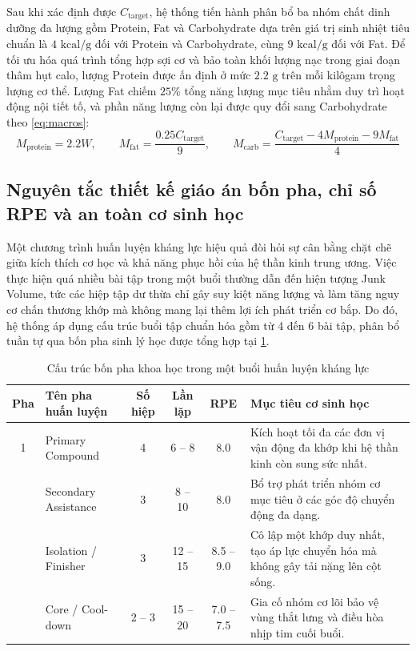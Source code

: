 Sau khi xác định được $C_{\text{target}}$, hệ thống tiến hành phân bổ ba nhóm chất dinh dưỡng đa lượng gồm Protein, Fat và Carbohydrate dựa trên giá trị sinh nhiệt tiêu chuẩn là $4\text{ kcal/g}$ đối với Protein và Carbohydrate, cùng $9\text{ kcal/g}$ đối với Fat. Để tối ưu hóa quá trình tổng hợp sợi cơ và bảo toàn khối lượng nạc trong giai đoạn thâm hụt calo, lượng Protein được ấn định ở mức $2.2\text{ g}$ trên mỗi kilôgam trọng lượng cơ thể. Lượng Fat chiếm $25\%$ tổng năng lượng mục tiêu nhằm duy trì hoạt động nội tiết tố, và phần năng lượng còn lại được quy đổi sang Carbohydrate theo \cref{eq:macros}:
\begin{equation}
    M_{\text{protein}} = 2.2W, \qquad M_{\text{fat}} = \frac{0.25 C_{\text{target}}}{9}, \qquad M_{\text{carb}} = \frac{C_{\text{target}} - 4M_{\text{protein}} - 9M_{\text{fat}}}{4}
    \label{eq:macros}
\end{equation}

\subsection{Nguyên tắc thiết kế giáo án bốn pha, chỉ số RPE và an toàn cơ sinh học}
\label{subsec:nguyen_tac_tap}

Một chương trình huấn luyện kháng lực hiệu quả đòi hỏi sự cân bằng chặt chẽ giữa kích thích cơ học và khả năng phục hồi của hệ thần kinh trung ương. Việc thực hiện quá nhiều bài tập trong một buổi thường dẫn đến hiện tượng Junk Volume, tức các hiệp tập dư thừa chỉ gây suy kiệt năng lượng và làm tăng nguy cơ chấn thương khớp mà không mang lại thêm lợi ích phát triển cơ bắp. Do đó, hệ thống áp dụng cấu trúc buổi tập chuẩn hóa gồm từ 4 đến 6 bài tập, phân bổ tuần tự qua bốn pha sinh lý học được tổng hợp tại \cref{tab:four_phases}.

\begin{table}[htbp]
\centering
\small
\caption{Cấu trúc bốn pha khoa học trong một buổi huấn luyện kháng lực}
\label{tab:four_phases}
\begin{tabularx}{\textwidth}{c l c c c >{\raggedright\arraybackslash}X}
    \toprule
    \textbf{Pha} & \textbf{Tên pha huấn luyện} & \textbf{Số hiệp} & \textbf{Lần lặp} & \textbf{RPE} & \textbf{Mục tiêu cơ sinh học} \\
    \midrule
    1 & Primary Compound & 4 & 6 -- 8 & 8.0 & Kích hoạt tối đa các đơn vị vận động đa khớp khi hệ thần kinh còn sung sức nhất. \\
    \addlinespace[4pt]
    2 & Secondary Assistance & 3 & 8 -- 10 & 8.0 & Bổ trợ phát triển nhóm cơ mục tiêu ở các góc độ chuyển động đa dạng. \\
    \addlinespace[4pt]
    3 & Isolation / Finisher & 3 & 12 -- 15 & 8.5 -- 9.0 & Cô lập một khớp duy nhất, tạo áp lực chuyển hóa mà không gây tải nặng lên cột sống. \\
    \addlinespace[4pt]
    4 & Core / Cool-down & 2 -- 3 & 15 -- 20 & 7.0 -- 7.5 & Gia cố nhóm cơ lõi bảo vệ vùng thắt lưng và điều hòa nhịp tim cuối buổi. \\
    \bottomrule
\end{tabularx}
\end{table}

